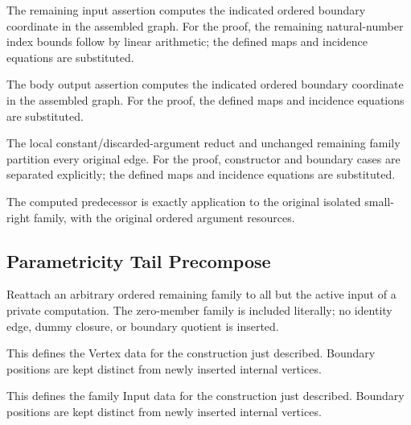 The remaining input assertion computes the indicated ordered boundary coordinate in the assembled graph.
For the proof, the remaining natural-number index bounds follow by linear arithmetic; the defined maps and incidence equations are substituted.
\par{}

The body output assertion computes the indicated ordered boundary coordinate in the assembled graph.
For the proof, the defined maps and incidence equations are substituted.
\par{}

The local constant/discarded-argument reduct and unchanged remaining family partition every original edge.
For the proof, constructor and boundary cases are separated explicitly; the defined maps and incidence equations are substituted.
\par{}

The computed predecessor is exactly application to the original isolated small-right family, with the original ordered argument resources.
\par{}

\subsection{Parametricity Tail Precompose}
Reattach an arbitrary ordered remaining family to all but the active input of a private computation. The zero-member family is included literally; no identity edge, dummy closure, or boundary quotient is inserted.

This defines the Vertex data for the construction just described. Boundary positions are kept distinct from newly inserted internal vertices.
\par{}

This defines the family Input data for the construction just described. Boundary positions are kept distinct from newly inserted internal vertices.
\par{}

